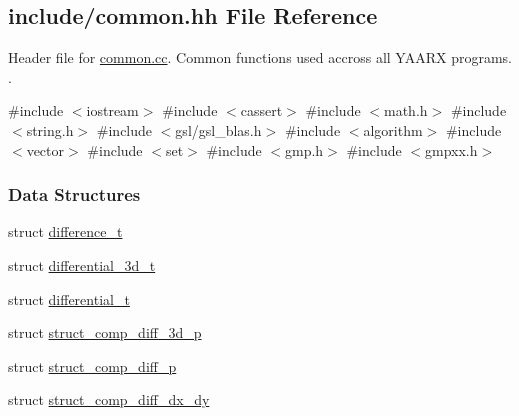 \hypertarget{common_8hh}{\subsection{include/common.hh \-File \-Reference}
\label{common_8hh}
}


\-Header file for \hyperlink{common_8cc}{common.\-cc}. \-Common functions used accross all \-Y\-A\-A\-R\-X programs. .  


{\ttfamily \#include $<$iostream$>$}\*
{\ttfamily \#include $<$cassert$>$}\*
{\ttfamily \#include $<$math.\-h$>$}\*
{\ttfamily \#include $<$string.\-h$>$}\*
{\ttfamily \#include $<$gsl/gsl\-\_\-blas.\-h$>$}\*
{\ttfamily \#include $<$algorithm$>$}\*
{\ttfamily \#include $<$vector$>$}\*
{\ttfamily \#include $<$set$>$}\*
{\ttfamily \#include $<$gmp.\-h$>$}\*
{\ttfamily \#include $<$gmpxx.\-h$>$}\*
\subsubsection*{\-Data \-Structures}
\begin{DoxyCompactItemize}
\item 
struct \hyperlink{structdifference__t}{difference\-\_\-t}
\item 
struct \hyperlink{structdifferential__3d__t}{differential\-\_\-3d\-\_\-t}
\item 
struct \hyperlink{structdifferential__t}{differential\-\_\-t}
\item 
struct \hyperlink{structstruct__comp__diff__3d__p}{struct\-\_\-comp\-\_\-diff\-\_\-3d\-\_\-p}
\item 
struct \hyperlink{structstruct__comp__diff__p}{struct\-\_\-comp\-\_\-diff\-\_\-p}
\item 
struct \hyperlink{structstruct__comp__diff__dx__dy}{struct\-\_\-comp\-\_\-diff\-\_\-dx\-\_\-dy}
\end{DoxyCompactItemize}

